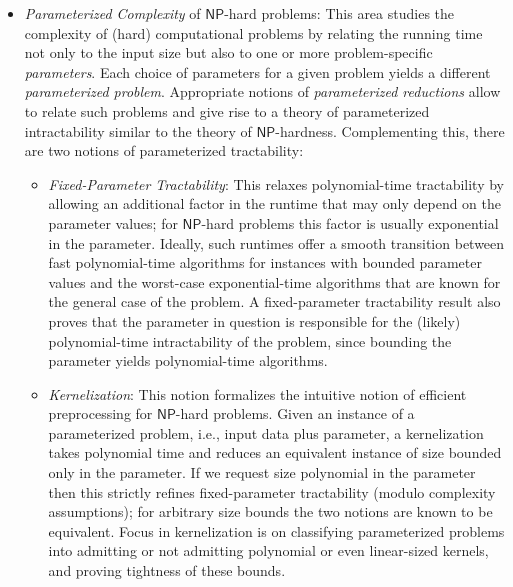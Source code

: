 \documentclass[a4paper,10pt]{article}
\newcommand{\NP}{\ensuremath{\mathsf{NP}}\xspace}
\begin{document}
\begin{itemize}
\item \emph{Parameterized Complexity} of \NP-hard problems: This area studies the complexity of (hard) computational problems by relating the running time not only to the input size but also to one or more problem-specific \emph{parameters}. Each choice of parameters for a given problem yields a different \emph{parameterized problem}. Appropriate notions of \emph{parameterized reductions} allow to relate such problems and give rise to a theory of parameterized intractability similar to the theory of \NP-hardness. Complementing this, there are two notions of parameterized tractability:
  \begin{itemize}
\item \emph{Fixed-Parameter Tractability}: 
This relaxes polynomial-time tractability by allowing an additional factor in the runtime that may only depend on the parameter values; for \NP-hard problems this factor is usually exponential in the parameter. Ideally, such runtimes offer a smooth transition between fast polynomial-time algorithms for instances with bounded parameter values and the worst-case exponential-time algorithms that are known for the general case of the problem. A fixed-parameter tractability result also proves that the parameter in question is responsible for the (likely) polynomial-time intractability of the problem, since bounding the parameter yields polynomial-time algorithms.
\item \emph{Kernelization}:
This notion formalizes the intuitive notion of efficient preprocessing for \NP-hard problems. Given an instance of a parameterized problem, i.e., input data plus parameter, a kernelization takes polynomial time and reduces an equivalent instance of size bounded only in the parameter. If we request size polynomial in the parameter then this strictly refines fixed-parameter tractability (modulo complexity assumptions); for arbitrary size bounds the two notions are known to be equivalent. Focus in kernelization is on classifying parameterized problems into admitting or not admitting polynomial or even linear-sized kernels, and proving tightness of these bounds.
  \end{itemize}

\end{itemize}
\end{document}
